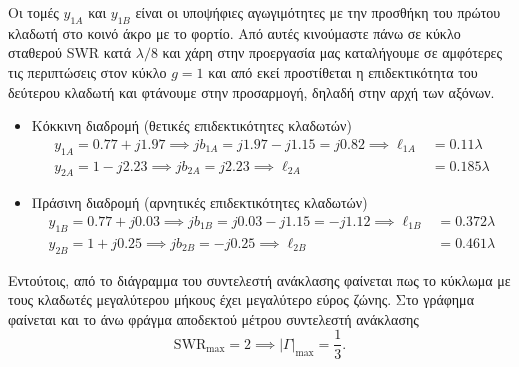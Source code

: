 \documentclass[12pt]{article}
\begin{document}
Οι τομές \(y_{1A}\) και \(y_{1B}\) είναι οι υποψήφιες αγωγιμότητες με την προσθήκη του πρώτου κλαδωτή στο κοινό άκρο με το φορτίο. Από αυτές κινούμαστε πάνω σε κύκλο σταθερού SWR κατά \(\lambda/8\) και χάρη στην προεργασία μας καταλήγουμε σε αμφότερες τις περιπτώσεις στον κύκλο \(g = 1\) και από εκεί προστίθεται η επιδεκτικότητα του δεύτερου κλαδωτή και φτάνουμε στην προσαρμογή, δηλαδή στην αρχή των αξόνων. 
\begin{itemize}
    \item Κόκκινη διαδρομή (θετικές επιδεκτικότητες κλαδωτών) 
    \begin{align}
        y_{1A} = 0.77 + j1.97 \implies jb_{1A} = j1.97 - j1.15 = j0.82 \implies \ell_{1A} &= 0.11\lambda \\ 
        y_{2A} = 1 - j2.23 \implies jb_{2A} = j2.23 \implies \ell_{2A} &= 0.185\lambda
    \end{align}
    \item Πράσινη διαδρομή (αρνητικές επιδεκτικότητες κλαδωτών) 
    \begin{align}
        y_{1B} = 0.77 + j0.03 \implies jb_{1B} = j0.03 - j1.15 = -j1.12 \implies \ell_{1B} &= 0.372\lambda \\ 
        y_{2B} = 1 + j0.25 \implies jb_{2B} = -j0.25 \implies \ell_{2B} &= 0.461\lambda
    \end{align}
\end{itemize}
Εντούτοις, από το διάγραμμα του συντελεστή ανάκλασης φαίνεται πως το κύκλωμα με τους κλαδωτές μεγαλύτερου μήκους έχει μεγαλύτερο εύρος ζώνης. Στο γράφημα φαίνεται και το άνω φράγμα αποδεκτού μέτρου συντελεστή ανάκλασης
\begin{equation*}
    \text{SWR}_{\max} = 2 \implies |\Gamma|_{\max} = \frac{1 }{3 }. 
\end{equation*}
\end{document}
